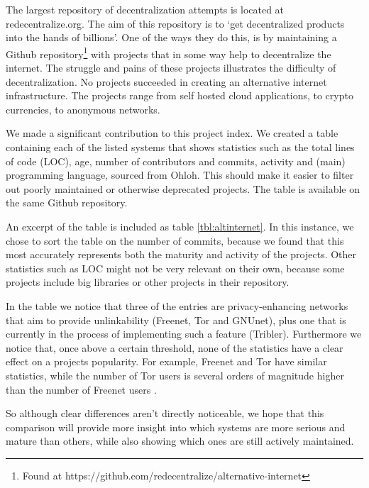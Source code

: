 \documentclass[12pt,journal,compsoc]{IEEEtran}
\begin{document}
	The largest repository of decentralization attempts is located at redecentralize.org. The aim of this repository is to \textquoteleft get decentralized products into the hands of billions\textquoteright \cite{aboutredecentralizeorg}. One of the ways they do this, is by maintaining a Github repository\footnote{Found at https://github.com/redecentralize/alternative-internet} with projects that in some way help to decentralize the internet. The struggle and pains of these projects illustrates the difficulty of decentralization. No projects succeeded in creating an alternative internet infrastructure. The projects range from self hosted cloud applications, to crypto currencies, to anonymous networks.



	We made a significant contribution to this project index. We created a table containing each of the listed systems that shows statistics such as the total lines of code (LOC), age, number of contributors and commits, activity and (main) programming language, sourced from Ohloh. This should make it easier to filter out poorly maintained or otherwise deprecated projects. The table is available on the same Github repository.
		
	An excerpt of the table is included as table \ref{tbl:altinternet}. In this instance, we chose to sort the table on the number of commits, because we found that this most accurately represents both the maturity and activity of the projects. Other statistics such as LOC might not be very relevant on their own, because some projects include big libraries or other projects in their repository.
		
	In the table we notice that three of the entries are privacy-enhancing networks that aim to provide unlinkability (Freenet, Tor and GNUnet), plus one that is currently in the process of implementing such a feature (Tribler). Furthermore we notice that, once above a certain threshold, none of the statistics have a clear effect on a projects popularity. For example, Freenet and Tor have similar statistics, while the number of Tor users \cite{tormetricsprojectwebsite} is several orders of magnitude higher than the number of Freenet users \cite{freenetstatistics}.
		
	So although clear differences aren't directly noticeable, we hope that this comparison will provide more insight into which systems are more serious and mature than others, while also showing which ones are still actively maintained.
		
\end{document}
